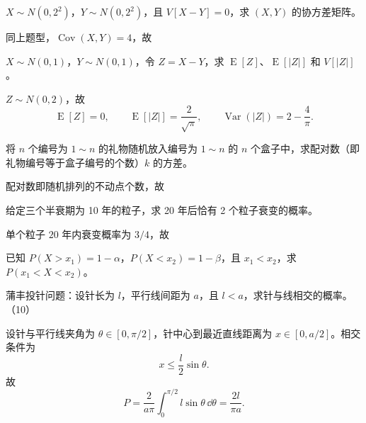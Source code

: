 \begin{question}
$X\sim N(0,2^2)$，$Y\sim N(0,2^2)$，且 $V[X-Y]=0$，求 $(X,Y)$ 的协方差矩阵。
\begin{solution}
同上题型，$\operatorname{Cov}(X,Y)=4$，故
\end{solution}
\end{question}

\begin{question}
$X\sim N(0,1)$，$Y\sim N(0,1)$，令 $Z=X-Y$，求 $\operatorname{E}[Z]$、$\operatorname{E}[|Z|]$ 和 $V[|Z|]$。
\begin{solution}
$Z\sim N(0,2)$，故
\[
\operatorname{E}[Z]=0,
\qquad \operatorname{E}[|Z|]=\frac{2}{\sqrt\pi},
\qquad \operatorname{Var}(|Z|)=2-\frac{4}{\pi}.
\]
\end{solution}
\end{question}

\begin{question}
将 $n$ 个编号为 $1\sim n$ 的礼物随机放入编号为 $1\sim n$ 的 $n$ 个盒子中，求配对数（即礼物编号等于盒子编号的个数）$k$ 的方差。
\begin{solution}
配对数即随机排列的不动点个数，故
\end{solution}
\end{question}

\begin{question}
给定三个半衰期为 10 年的粒子，求 20 年后恰有 2 个粒子衰变的概率。
\begin{solution}
单个粒子 $20$ 年内衰变概率为 $3/4$，故
\end{solution}
\end{question}

\begin{question}
已知 $P(X>x_1)=1-\alpha$，$P(X<x_2)=1-\beta$，且 $x_1<x_2$，求 $P(x_1<X<x_2)$。
\begin{solution}

\end{solution}
\end{question}

\begin{question}
蒲丰投针问题：设针长为 $l$，平行线间距为 $a$，且 $l<a$，求针与线相交的概率。（10）
\begin{solution}
设针与平行线夹角为 $\theta\in[0,\pi/2]$，针中心到最近直线距离为 $x\in[0,a/2]$。相交条件为
\[
x\le \frac{l}{2}\sin\theta.
\]
故
\[
P=\frac{2}{a\pi}\int_0^{\pi/2} l\sin\theta\,\dd{\theta}
=\frac{2l}{\pi a}.
\]
\end{solution}
\end{question}

